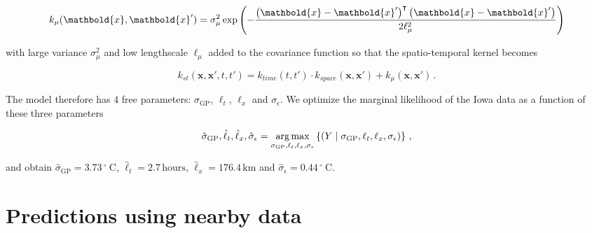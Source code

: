 \documentclass[letter]{article}
\newcommand{\genericdel}[3]{%
      \left#1#3\right#2
    }
\newcommand{\del}[1]{\genericdel(){#1}}
\newcommand{\cbr}[1]{\genericdel\{\}{#1}}
\DeclareMathOperator*{\argmax}{arg\,max}
\let\Pr\relax
\DeclareMathOperator{\Pr}{\mathbb{P}}
\newcommand{\xvec}{\mathbold{x}}
\newcommand{\trans}{^{\intercal}}
\newcommand{\sigmaf}{\sigma_{\mathrm{GP}}}
\newcommand{\sigman}{\sigma_{\epsilon}}
\newcommand{\degreeC}{{}^{\circ}~\mathrm{C}}
\begin{document}
\begin{equation}
    k_{\mu}(\xvec, \xvec') = \sigma_\mu^2 \exp\del{-\frac{\del{\xvec-\xvec'}\trans\del{\xvec-\xvec'}}{2\ell_\mu^2}}
\end{equation}

with large variance \(\sigma_\mu^2\) and low lengthscale \(\ell_\mu\) added to the covariance function so that the spatio-temporal kernel becomes

\begin{equation}
    k_{st}(\xvec,\xvec',t,t') = k_{time}(t,t') \cdot k_{space}(\xvec, \xvec') + k_\mu(\xvec, \xvec') \,.
\end{equation}

The model therefore has 4 free parameters: \(\sigmaf\), \(\ell_t\), \(\ell_x\) and \(\sigman\). We optimize the marginal likelihood of the Iowa data as a function of these three parameters

\begin{equation}
\label{eq:optimization}
\hat\sigmaf,\hat\ell_t,\hat\ell_x,\hat\sigman = \argmax_{\sigmaf,\ell_t,\ell_x,\sigman} \cbr{ \Pr\del{ Y \mid {\sigmaf,\ell_t,\ell_x,\sigman} } }\,,
\end{equation}

and obtain \(\hat\sigmaf=3.73\,\degreeC\), \(\hat\ell_t=2.7\,\mathrm{hours}\), \(\hat\ell_x=176.4\,\mathrm{km}\) and \(\hat\sigman=0.44\,\degreeC\).
    


        \section{Predictions using nearby data}\label{predictions-using-nearby-data}
    
\end{document}
